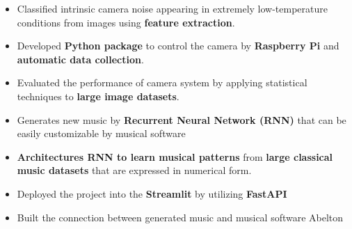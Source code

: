 \documentclass[10pt,a4paper,ragged2e,withhyper]{altacv}
\begin{document}
\begin{itemize}
\item Classified intrinsic camera noise appearing in extremely low-temperature conditions from images using {\bf feature extraction}.
\item Developed {\bf Python package} to control the camera by {\bf Raspberry Pi} and {\bf automatic data collection}.
\item Evaluated the performance of camera system by applying statistical techniques to {\bf large image datasets}.
\end{itemize}

\medskip


\begin{itemize}
\item Generates new music by {\bf Recurrent Neural Network (RNN)} that can be easily customizable by musical software
\item {\bf Architectures RNN to learn musical patterns} from {\bf large classical music datasets} that are expressed in numerical form. 
\item Deployed the project into the {\bf Streamlit} by utilizing {\bf FastAPI}
\item Built the connection between generated music and musical software Abelton
\end{itemize}
\medskip

\end{document}
